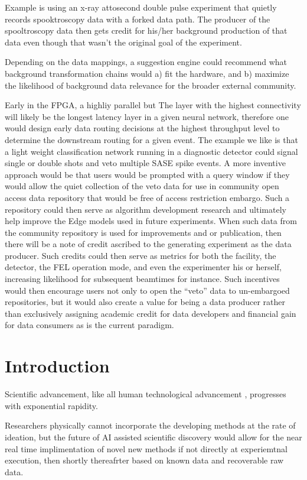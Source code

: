 \documentclass{article}
\begin{document}
Example is using an x-ray attosecond double pulse experiment that quietly records spooktroscopy data with a forked data path. The producer of the spooltroscopy data then gets credit for his/her background production of that data even though that wasn’t the original goal of the experiment.

Depending on the data mappings, a suggestion engine could recommend what background transformation chains would a) fit the hardware, and b) maximize the likelihood of background data relevance for the broader external community.

Early in the FPGA, a highliy parallel but 
The layer with the highest connectivity will likely be the longest latency layer in a given neural network, therefore one would design early data routing decisions at the highest throughput level to determine the downstream routing for a given event.  
The example we like is that a light weight classification network running in a diagnostic detector could signal single or double shots and veto multiple SASE spike events.
A more inventive approach would be that users would be prompted with a query window if they would allow the quiet collection of the veto data for use in community open access data repository that would be free of access restriction embargo.
Such a repository could then serve as algorithm development research and ultimately help improve the Edge models used in future experiments.
When such data from the community repository is used for improvements and or publication, then there will be a note of credit ascribed to the generating experiment as the data producer.
Such credits could then serve as metrics for both the facility, the detector, the FEL operation mode, and even the experimenter his or herself, increasing likelihood for subsequent beamtimes for instance.
Such incentives would then encourage users not only to open the ``veto'' data to un-embargoed repositories, but it would also create a value for being a data producer rather than exclusively assigning academic credit for data developers and financial gain for data consumers as is the current paradigm.




\section{Introduction}
Scientific advancement, like all human technological advancement \cite{Kurzweil}, progresses with exponential rapidity.

Researchers physically cannot incorporate the developing methods at the rate of ideation, but the future of AI assisted scientific discovery would allow for the near real time implimentation of novel new methods if not directly at experiemtnal execution, then shortly thereafrter based on known data and recoverable raw data.
\end{document}

